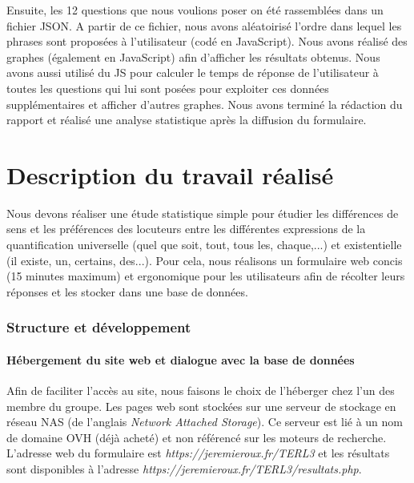 \documentclass[11pt,letterpaper]{article}
\begin{document}
\vspace{-7px}

Ensuite, les 12 questions que nous voulions poser on été rassemblées dans un fichier JSON. A partir de ce fichier, nous avons aléatoirisé l'ordre dans lequel les phrases sont proposées à l'utilisateur (codé en JavaScript). Nous avons réalisé des graphes (également en JavaScript) afin d'afficher les résultats obtenus. Nous avons aussi utilisé du JS pour calculer le temps de réponse de l'utilisateur à toutes les questions qui lui sont posées pour exploiter ces données supplémentaires et afficher d'autres graphes. Nous avons terminé la rédaction du rapport et réalisé une analyse statistique après la diffusion du formulaire.

\newpage

\part{Description du travail réalisé}

Nous devons réaliser une étude statistique simple pour étudier les différences de sens et les préférences des locuteurs entre les différentes expressions de la quantification universelle (quel que soit, tout, tous les, chaque,...) et existentielle (il existe, un, certains, des...). Pour cela, nous réalisons un formulaire web concis (15 minutes maximum) et ergonomique pour les utilisateurs afin de récolter leurs réponses et les stocker dans une base de données.

\setcounter{section}{0}

\section{Structure et développement}

\subsection{Hébergement du site web et dialogue avec la base de données}

Afin de faciliter l'accès au site, nous faisons le choix de l'héberger chez l'un des membre du groupe. Les pages web sont stockées sur une serveur de stockage en réseau NAS (de l'anglais \textit{Network Attached Storage}). Ce serveur est lié à un nom de domaine OVH (déjà acheté) et non référencé sur les moteurs de recherche. L'adresse web du formulaire est \textit{https://jeremieroux.fr/TERL3} et les résultats sont disponibles à l'adresse \textit{https://jeremieroux.fr/TERL3/resultats.php}.\\
\end{document}
